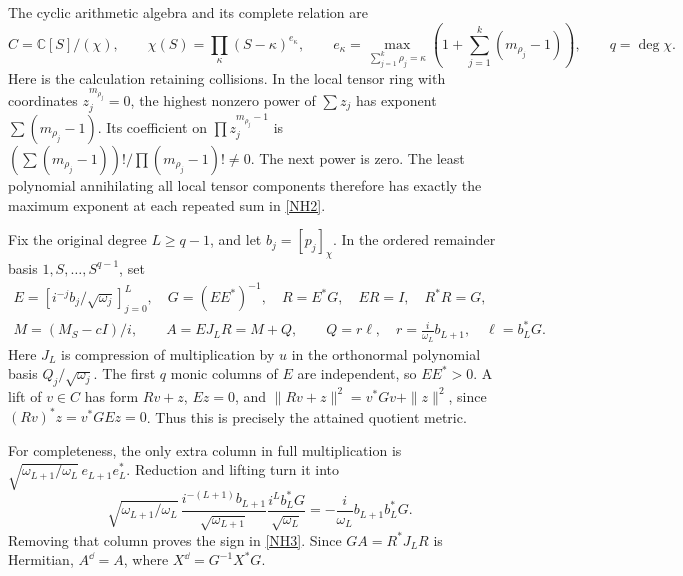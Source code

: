 \documentclass[11pt]{article}
\newcommand{\C}{\mathbb C}\newcommand{\R}{\mathbb R}
\begin{document}
The cyclic arithmetic algebra and its complete relation are
\begin{equation}\tag{NH2}\label{NH2}
C=\C[S]/(\chi),\qquad
\chi(S)=\prod_\kappa(S-\kappa)^{e_\kappa},\qquad
e_\kappa=\max_{\sum_{j=1}^k\rho_j=\kappa}
\left(1+\sum_{j=1}^k(m_{\rho_j}-1)\right),\qquad q=\deg\chi .
\end{equation}
Here is the calculation retaining collisions. In the local
tensor ring with coordinates \(z_j^{m_{\rho_j}}=0\),
the highest nonzero power of \(\sum z_j\) has exponent
\(\sum(m_{\rho_j}-1)\). Its coefficient on
\(\prod z_j^{m_{\rho_j}-1}\) is
\((\sum(m_{\rho_j}-1))!/\prod(m_{\rho_j}-1)!\ne0\).
The next power is zero. The least polynomial annihilating
all local tensor components therefore has exactly the
maximum exponent at each repeated sum in \eqref{NH2}.

Fix the original degree \(L\ge q-1\), and let \(b_j=[p_j]_\chi\).
In the ordered remainder basis \(1,S,\ldots,S^{q-1}\), set
\begin{equation}\tag{NH3}\label{NH3}
\begin{gathered}
E=[i^{-j}b_j/\sqrt{\omega_j}]_{j=0}^L,\quad
G=(EE^*)^{-1},\quad R=E^*G,\quad ER=I,\quad R^*R=G,\\
M=(M_S-cI)/i,\qquad
A=EJ_LR=M+Q,\qquad
Q=r\ell,\quad r=\frac{i}{\omega_L}b_{L+1},\quad
\ell=b_L^*G .
\end{gathered}
\end{equation}
Here \(J_L\) is compression of multiplication by \(u\)
in the orthonormal polynomial basis
\(Q_j/\sqrt{\omega_j}\).
The first \(q\) monic columns of \(E\) are independent,
so \(EE^*>0\). A lift of \(v\in C\) has form \(Rv+z\),
\(Ez=0\), and
\(\|Rv+z\|^2=v^*Gv+\|z\|^2\), since
\((Rv)^*z=v^*GEz=0\).
Thus this is precisely the attained quotient metric.

For completeness, the only extra column in full multiplication
is \(\sqrt{\omega_{L+1}/\omega_L}\,e_{L+1}e_L^*\).
Reduction and lifting turn it into
\[
\sqrt{\omega_{L+1}/\omega_L}\,
\frac{i^{-(L+1)}b_{L+1}}{\sqrt{\omega_{L+1}}}
\frac{i^Lb_L^*G}{\sqrt{\omega_L}}
=-\frac{i}{\omega_L}b_{L+1}b_L^*G .
\]
Removing that column proves the sign in \eqref{NH3}.
Since \(GA=R^*J_LR\) is Hermitian,
\(A^\dd=A\), where \(X^\dd=G^{-1}X^*G\).
\end{document}
